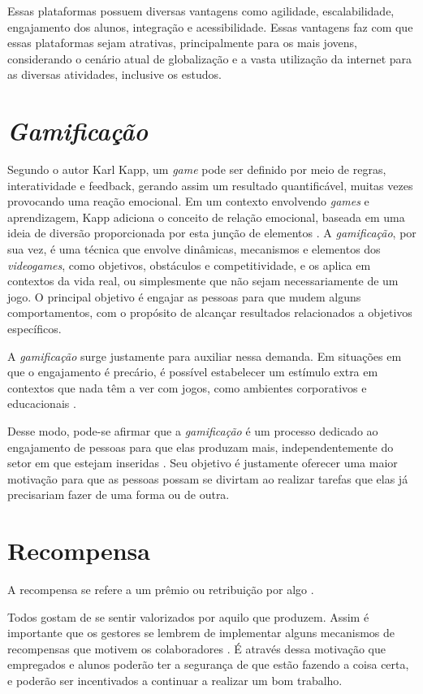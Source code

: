 \documentclass[
    12pt,               %
    openright,          %
    oneside,
    a4paper,            %
    english,            %
    brazil              %
    ]{ifsp-spo-inf-ctds} %
\begin{document}
Essas plataformas possuem diversas vantagens como agilidade, escalabilidade, engajamento dos alunos, integração e acessibilidade. Essas vantagens faz com que essas plataformas sejam atrativas, principalmente para os mais jovens, considerando o cenário atual de globalização e a vasta utilização da internet para as diversas atividades, inclusive os estudos.


\section{\textit{Gamificação}}
Segundo o autor Karl Kapp, um \textit{game} pode ser definido por meio de regras, interatividade e \gls{feedback}, gerando assim um resultado quantificável, muitas vezes provocando uma reação emocional. Em um contexto envolvendo \textit{games} e aprendizagem, Kapp adiciona o conceito de relação emocional, baseada em uma ideia de diversão proporcionada por esta junção de elementos \cite{gamification-of-learning:2012}.
A \textit{gamificação}, por sua vez, é uma técnica que envolve dinâmicas, mecanismos e elementos dos \textit{videogames}, como objetivos, obstáculos e competitividade, e os aplica em contextos da vida real, ou simplesmente que não sejam necessariamente de um jogo. O principal objetivo é engajar as pessoas para que mudem alguns comportamentos, com o propósito de alcançar resultados relacionados a objetivos específicos.


A \textit{gamificação} surge justamente para auxiliar nessa demanda. Em situações em que o engajamento é precário, é possível estabelecer um estímulo extra em contextos que nada têm a ver com jogos, como ambientes corporativos e educacionais
\cite{gamificacao-corporativa:2017}.


Desse modo, pode-se afirmar que a \textit{gamificação} é um processo dedicado ao engajamento de pessoas para que elas produzam mais, independentemente do setor em que estejam inseridas
\cite{gamificacao-corporativa:2017}. Seu objetivo é justamente oferecer uma maior motivação para que as pessoas possam se divirtam ao realizar tarefas que elas já precisariam fazer de uma forma ou de outra.


\section{Recompensa}
A recompensa se refere a um prêmio ou retribuição por algo \cite{dicio-recompensa:2009}.


Todos gostam de se sentir valorizados por aquilo que produzem. Assim é importante que os gestores se lembrem de implementar alguns mecanismos de recompensas que motivem os colaboradores \cite{gamificacao-corporativa:2017}. É através dessa motivação que empregados e alunos poderão ter a segurança de que estão fazendo a coisa certa, e poderão ser incentivados a continuar a realizar um bom trabalho.
\end{document}
